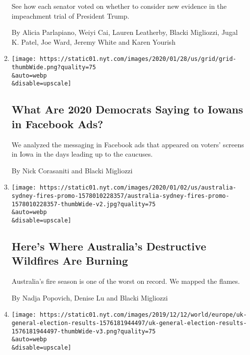 \begin{enumerate}
  See how each senator voted on whether to consider new evidence in the
  impeachment trial of President Trump.

  By Alicia Parlapiano, Weiyi Cai, Lauren Leatherby, Blacki Migliozzi,
  Jugal K. Patel, Joe Ward, Jeremy White and Karen Yourish
\item
  \href{/interactive/2020/01/29/us/politics/iowa-facebook-political-ads.html}{}

  \texttt{[image: https://static01.nyt.com/images/2020/01/28/us/grid/grid-thumbWide.png?quality=75\\\&auto=webp\\\&disable=upscale]}

  \hypertarget{what-are-2020-democrats-saying-to-iowans-in-facebook-ads}{%
  \subsection{What Are 2020 Democrats Saying to Iowans in Facebook
  Ads?}\label{what-are-2020-democrats-saying-to-iowans-in-facebook-ads}}

  We analyzed the messaging in Facebook ads that appeared on voters'
  screens in Iowa in the days leading up to the caucuses.

  By Nick Corasaniti and Blacki Migliozzi
\item
  \href{/interactive/2020/01/02/climate/australia-fires-map.html}{}

  \texttt{[image: https://static01.nyt.com/images/2020/01/02/us/australia-sydney-fires-promo-1578010228357/australia-sydney-fires-promo-1578010228357-thumbWide-v2.jpg?quality=75\\\&auto=webp\\\&disable=upscale]}

  \hypertarget{heres-where-australias-destructive-wildfires-are-burning}{%
  \subsection{Here's Where Australia's Destructive Wildfires Are
  Burning}\label{heres-where-australias-destructive-wildfires-are-burning}}

  Australia's fire season is one of the worst on record. We mapped the
  flames.

  By Nadja Popovich, Denise Lu and Blacki Migliozzi
\item
  \href{/interactive/2019/12/13/world/europe/uk-general-election-results.html}{}

  \texttt{[image: https://static01.nyt.com/images/2019/12/12/world/europe/uk-general-election-results-1576181944497/uk-general-election-results-1576181944497-thumbWide-v3.png?quality=75\\\&auto=webp\\\&disable=upscale]}


\end{enumerate}
